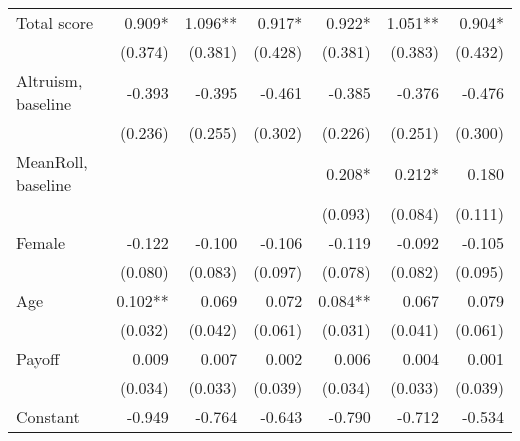 \begin{table}[htbp]
\begin{adjustbox}{width=1\textwidth}
\begin{threeparttable}
\begin{tabular}{l*{6}{D{.}{.}{-1}}}
\midrule
Total score         &               0.909*  &               1.096** &               0.917*  &               0.922*  &               1.051** &               0.904*  \\
                    &             (0.374)   &             (0.381)   &             (0.428)   &             (0.381)   &             (0.383)   &             (0.432)   \\
Altruism, baseline  &              -0.393   &              -0.395   &              -0.461   &              -0.385   &              -0.376   &              -0.476   \\
                    &             (0.236)   &             (0.255)   &             (0.302)   &             (0.226)   &             (0.251)   &             (0.300)   \\
MeanRoll, baseline  &                       &                       &                       &               0.208*  &               0.212*  &               0.180   \\
                    &                       &                       &                       &             (0.093)   &             (0.084)   &             (0.111)   \\
Female              &              -0.122   &              -0.100   &              -0.106   &              -0.119   &              -0.092   &              -0.105   \\
                    &             (0.080)   &             (0.083)   &             (0.097)   &             (0.078)   &             (0.082)   &             (0.095)   \\
Age                 &               0.102** &               0.069   &               0.072   &               0.084** &               0.067   &               0.079   \\
                    &             (0.032)   &             (0.042)   &             (0.061)   &             (0.031)   &             (0.041)   &             (0.061)   \\
Payoff              &               0.009   &               0.007   &               0.002   &               0.006   &               0.004   &               0.001   \\
                    &             (0.034)   &             (0.033)   &             (0.039)   &             (0.034)   &             (0.033)   &             (0.039)   \\
Constant            &              -0.949   &              -0.764   &              -0.643   &              -0.790   &              -0.712   &              -0.534   \\

\end{tabular}
\end{threeparttable}
\end{adjustbox}
\end{table}

